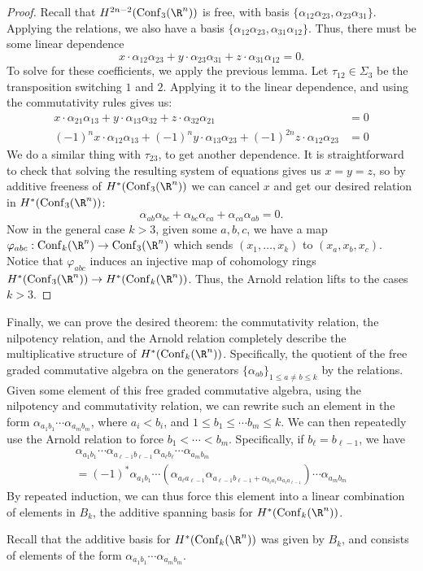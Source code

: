 \documentclass[11pt,letterpaper]{article}
\providecommand{\conf}{\mathrm{Conf}}
\begin{document}
\begin{proof}
    Recall that $H^{2n-2}(\conf_3(\R^n))$ is free, with basis $\{\alpha_{12}\alpha_{23}, \alpha_{23}\alpha_{31}\}$. Applying the relations, we also have a basis $\{\alpha_{12}\alpha_{23}, \alpha_{31}\alpha_{12}\}$. Thus, there must be some linear dependence
    \[
        x\cdot \alpha_{12}\alpha_{23}+y\cdot \alpha_{23}\alpha_{31}+z\cdot \alpha_{31}\alpha_{12} = 0 
    .\] 
    To solve for these coefficients, we apply the previous lemma. Let $\tau_{12}\in \Sigma_3$ be the transposition switching $1$ and $2$. Applying it to the linear dependence, and using the commutativity rules gives us:
    \[
        \begin{aligned}
            x\cdot \alpha_{21}\alpha_{13} + y\cdot \alpha_{13}\alpha_{32}+z\cdot \alpha_{32}\alpha_{21}&=0\\
            (-1)^nx\cdot \alpha_{12}\alpha_{13} + (-1)^ny\cdot \alpha_{13}\alpha_{23}+(-1)^{2n}z\cdot \alpha_{12}\alpha_{23}&=0
        \end{aligned}
    \] 
    We do a similar thing with $\tau_{23}$, to get another dependence. It is straightforward to check that solving the resulting system of equations gives us $x=y=z$, so by additive freeness of $H^*(\conf_3(\R^n))$ we can cancel $x$ and get our desired relation in $H^*(\conf_3(\R^n))$:
    \[
        \alpha_{ab}\alpha_{bc}+\alpha_{bc}\alpha_{ca}+\alpha_{ca}\alpha_{ab}=0
    .\]
    Now in the general case $k> 3$, given some $a,b,c$, we have a map $\varphi_{abc} : \conf_k(\R^n) \to \conf_3(\R^n)$ which sends $(x_1,\ldots,x_k)$ to $(x_a,x_b,x_c)$. Notice that $\varphi_{abc}$ induces an injective map of cohomology rings $H^*(\conf_3(\R^n)) \to H^*(\conf_k(\R^n))$. Thus, the Arnold relation lifts to the cases $k>3$.
\end{proof}

Finally, we can prove the desired theorem: the commutativity relation, the nilpotency relation, and the Arnold relation completely describe the multiplicative structure of $H^*(\conf_k(\R^n))$. Specifically, the quotient of the free graded commutative algebra on the generators $\{\alpha_{ab}\}_{1\leq a\neq  b\leq k}$ by the relations. Given some element of this free graded commutative algebra, using the nilpotency and commutativity relation, we can rewrite such an element in the form
$\alpha_{a_1b_1}\cdots\alpha_{a_mb_m}$, where $a_i<b_i$, and $1\leq b_1\leq \cdots b_m\leq k$. We can then repeatedly use the Arnold relation to force $b_1<\cdots<b_m$. Specifically, if $b_\ell=b_{\ell-1}$, we have
\[
    \begin{aligned}
        \alpha_{a_1b_1}\cdots \alpha_{a_{\ell-1}b_{\ell-1}}\alpha_{a_\ell b_\ell}\cdots \alpha_{a_m b_m} \\
        = (-1)^* \alpha_{a_1b_1}\cdots\left( \alpha_{a_\ell a_{\ell-1}}\alpha_{a_{\ell -1}b_{\ell -1} + \alpha_{b_{\ell}a_\ell}\alpha_{a_\ell a_{\ell - 1}}}\right)\cdots \alpha_{a_m b_m}   
    \end{aligned}
\] 
By repeated induction, we can thus force this element into a linear combination of elements in $B_k$, the additive spanning basis for $H^*(\conf_k(\R^n))$.



Recall that the additive basis for $H^*(\conf_k(\R^n))$ was given by $B_k$, and consists of elements of the form $\alpha_{a_1b_1}\cdots \alpha_{a_mb_m}$.
\end{document}
